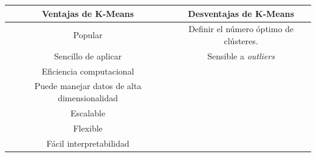 \begin{table}[ht]
  \centering
  \begin{tabular}{|c|c|}
    \hline
    Ventajas de K-Means & Desventajas de K-Means \\ \hline
    Popular &  Definir el número óptimo de clústeres.\\ \hline
    Sencillo de aplicar & Sensible a \textit{outliers} \\ \hline
    Eficiencia computacional &  \\ \hline
    Puede manejar datos de alta dimensionalidad &  \\ \hline
    Escalable &  \\ \hline
    Flexible &  \\ \hline
    Fácil interpretabilidad &  \\ \hline
  \end{tabular}
  \label{tab:ventajas_desventajas-K-Means}
\end{table}